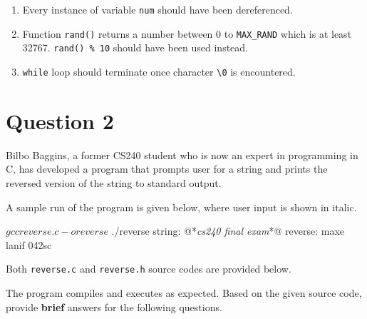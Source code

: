 \documentclass[12pt,letterpaper,twoside]{article}
\begin{document}
\begin{enumerate}

\item
Every instance of variable \texttt{num} should have been dereferenced.
\lstset{language=c,tabsize=4}


\item
Function \texttt{rand()} returns a number between 0 to \texttt{MAX\_RAND} which is at least 32767.
\texttt{rand() \% 10} should have been used instead.
\lstset{language=c,tabsize=4}



\item
\texttt{while} loop should terminate once character \texttt{\textbackslash 0} is encountered.
\lstset{language=c,tabsize=4}


\end{enumerate}

\section*{Question 2}

Bilbo Baggins, a former CS240 student who is now an expert in programming in C, has developed a program that prompts user for a string and prints the reversed version of the string to standard output.

A sample run of the program is given below, where user input is shown in italic.

\begin{terminal}
$ gcc reverse.c -o reverse
$ ./reverse
string: @*\textit{cs240 final exam}*@
reverse: maxe lanif 042sc
\end{terminal}

Both \texttt{reverse.c} and \texttt{reverse.h} source codes are provided below.

\lstset{language=c,tabsize=4}



The program compiles and executes as expected.
Based on the given source code, provide \textbf{brief} answers for the following questions.
\end{document}
